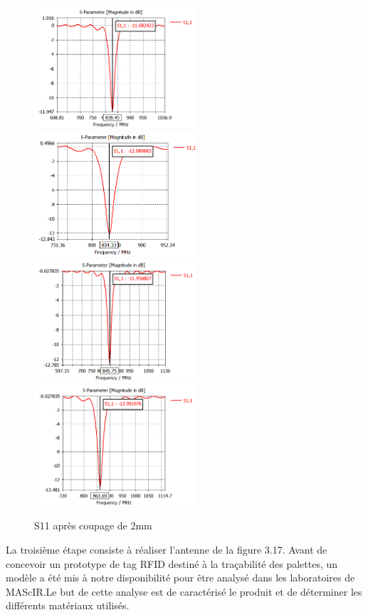 \documentclass[11pt, a4paper, twoside]{book}
\begin{document}
\begin{figure}[H]
\centering
\includegraphics[width=6cm]{11}
\includegraphics[width=6cm]{22}\\
\includegraphics[width=6cm]{33}
\includegraphics[width=6cm]{44}
\caption{S11 après coupage de 2mm }
\end{figure}

La troisième étape  consiste à réaliser l'antenne de la figure 3.17. 
Avant de concevoir un prototype de tag RFID destiné à la traçabilité des palettes, un modèle a été mis à notre disponibilité pour être analysé dans les laboratoires de MAScIR.Le but de cette analyse est de caractérisé le produit et de déterminer les différents matériaux utilisés.\\
\end{document}
